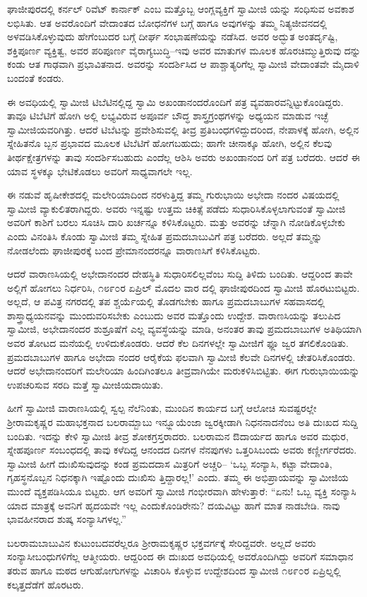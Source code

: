 ಘಾಜೀಪುರದಲ್ಲಿ ಕರ್ನಲ್ ರಿವೆಟ್ ಕಾರ್ನಾಕ್ ಎಂಬ ಮತ್ತೊಬ್ಬ ಆಂಗ್ಲವ್ಯಕ್ತಿಗೆ ಸ್ವಾಮೀಜಿ ಯನ್ನು ಸಂಧಿಸುವ ಅವಕಾಶ ಲಭಿಸಿತು. ಆತ ಅವರೊಂದಿಗೆ ವೇದಾಂತದ ಬೋಧನೆಗಳ ಬಗ್ಗೆ ಹಾಗೂ ಅವುಗಳನ್ನು ತಮ್ಮ ನಿತ್ಯಜೀವನದಲ್ಲಿ ಅಳವಡಿಸಿಕೊಳ್ಳುವುದು ಹೇಗೆಂಬುದರ ಬಗ್ಗೆ ದೀರ್ಘ ಸಂಭಾಷಣೆಯನ್ನು ನಡೆಸಿದ. ಅವರ ಅದ್ಭುತ ಅಂತರ್ದೃಷ್ಟಿ, ಶಕ್ತಿಪೂರ್ಣ ವ್ಯಕ್ತಿತ್ವ, ಅವರ ಪರಿಪೂರ್ಣ ವೈರಾಗ್ಯಬುದ್ಧಿ–ಇವು ಅವರ ಮಾತುಗಳ ಮೂಲಕ ಹೊರಚಿಮ್ಮುತ್ತಿರುವು ದನ್ನು ಕಂಡು ಆತ ಗಾಢವಾಗಿ ಪ್ರಭಾವಿತನಾದ. ಅವರನ್ನು ಸಂದರ್ಶಿಸಿದ ಆ ಪಾಶ್ಚಾತ್ಯರಿಗೆಲ್ಲ ಸ್ವಾಮೀಜಿ ವೇದಾಂತವೇ ಮೈದಾಳಿ ಬಂದಂತೆ ಕಂಡರು.

ಈ ಅವಧಿಯಲ್ಲಿ ಸ್ವಾಮೀಜಿ ಟಿಬೆಟಿನಲ್ಲಿದ್ದ ಸ್ವಾಮಿ ಅಖಂಡಾನಂದರೊಂದಿಗೆ ಪತ್ರ ವ್ಯವಹಾರವನ್ನಿಟ್ಟುಕೊಂಡಿದ್ದರು. ತಾವೂ ಟಿಬೆಟಿಗೆ ಹೋಗಿ ಅಲ್ಲಿ ಲಭ್ಯವಿರುವ ಅಪೂರ್ವ ಬೌದ್ಧ ಶಾಸ್ತ್ರಗ್ರಂಥಗಳನ್ನು ಅಧ್ಯಯನ ಮಾಡುವ ಇಚ್ಛೆ ಸ್ವಾಮೀಜಿಯವರಿಗಿತ್ತು. ಆದರೆ ಟಿಬೆಟನ್ನು ಪ್ರವೇಶಿಸುವಲ್ಲಿ ತೀವ್ರ ಪ್ರತಿಬಂಧಗಳಿದ್ದುದರಿಂದ, ನೇಪಾಳಕ್ಕೆ ಹೋಗಿ, ಅಲ್ಲಿನ ಸ್ನೇಹಿತನೊ ಬ್ಬನ ಪ್ರಭಾವದ ಮೂಲಕ ಟಿಬೆಟಿಗೆ ಹೋಗಬಹುದು; ಹಾಗೇ ಚೀನಾಕ್ಕೂ ಹೋಗಿ, ಅಲ್ಲಿನ ಕೆಲವು ತೀರ್ಥಕ್ಷೇತ್ರಗಳನ್ನು ತಾವು ಸಂದರ್ಶಿಸಬಹುದು ಎಂದೆಲ್ಲ ಆಶಿಸಿ ಅವರು ಅಖಂಡಾನಂದ ರಿಗೆ ಪತ್ರ ಬರೆದರು. ಆದರೆ ಈ ಯಾವ ಸ್ಥಳಕ್ಕೂ ಭೇಟಿಕೊಡಲು ಅವರಿಗೆ ಸಾಧ್ಯವಾಗಲೇ ಇಲ್ಲ.

ಈ ನಡುವೆ ಹೃಷೀಕೇಶದಲ್ಲಿ ಮಲೇರಿಯಾದಿಂದ ನರಳುತ್ತಿದ್ದ ತಮ್ಮ ಗುರುಭಾಯಿ ಅಭೇದಾ ನಂದರ ವಿಷಯದಲ್ಲಿ ಸ್ವಾಮೀಜಿ ವ್ಯಾಕುಲಿತರಾಗಿದ್ದರು. ಅವರು ಇನ್ನಷ್ಟು ಉತ್ತಮ ಚಿಕಿತ್ಸೆ ಪಡೆದು ಸುಧಾರಿಸಿಕೊಳ್ಳಲಾಗುವಂತೆ ಸ್ವಾಮೀಜಿ ಅವರಿಗೆ ಕಾಶಿಗೆ ಬರಲು ಸೂಚಿಸಿ ದಾರಿ ಖರ್ಚನ್ನೂ ಕಳಿಸಿಕೊಟ್ಟರು. ಮತ್ತು ಅವರನ್ನು ಚೆನ್ನಾಗಿ ನೋಡಿಕೊಳ್ಳಬೇಕು ಎಂದು ವಿನಂತಿಸಿ ಕೊಂಡು ಸ್ವಾಮೀಜಿ ತಮ್ಮ ಸ್ನೇಹಿತ ಪ್ರಮದಬಾಬುವಿಗೆ ಪತ್ರ ಬರೆದರು. ಅಲ್ಲದೆ ತಮ್ಮನ್ನು ನೋಡಲೆಂದು ಘಾಜೀಪುರಕ್ಕೆ ಬಂದ ಪ್ರೇಮಾನಂದರನ್ನೂ ವಾರಾಣಸಿಗೆ ಕಳಿಸಿಕೊಟ್ಟರು.

ಆದರೆ ವಾರಾಣಸಿಯಲ್ಲಿ ಅಭೇದಾನಂದರ ದೇಹಸ್ಥಿತಿ ಸುಧಾರಿಸಲಿಲ್ಲವೆಂಬ ಸುದ್ದಿ ತಿಳಿದು ಬಂದಿತು. ಆದ್ದರಿಂದ ತಾವೇ ಅಲ್ಲಿಗೆ ಹೋಗಲು ನಿರ್ಧರಿಸಿ, ೧೮೯೦ರ ಏಪ್ರಿಲ್ ಮೊದಲ ವಾರ ದಲ್ಲಿ ಘಾಜೀಪುರದಿಂದ ಸ್ವಾಮೀಜಿ ಹೊರಟುಬಿಟ್ಟರು. ಅಲ್ಲದೆ, ಆ ಪವಿತ್ರ ನಗರದಲ್ಲಿ ತಪ ಶ್ಚರ್ಯೆಯಲ್ಲಿ ತೊಡಗಬೇಕು ಹಾಗೂ ಪ್ರಮದಬಾಬುಗಳ ಸಹವಾಸದಲ್ಲಿ ಶಾಸ್ತ್ರಾಧ್ಯಯನವನ್ನು ಮುಂದುವರಿಸಬೇಕು ಎಂಬುದು ಅವರ ಮತ್ತೊಂದು ಉದ್ದೇಶ. ವಾರಾಣಸಿಯನ್ನು ತಲುಪಿದ ಸ್ವಾಮೀಜಿ, ಅಭೇದಾನಂದರ ಶುಶ್ರೂಷೆಗೆ ಎಲ್ಲ ವ್ಯವಸ್ಥೆಯನ್ನು ಮಾಡಿ, ಅನಂತರ ತಾವು ಪ್ರಮದಬಾಬುಗಳ ಅತಿಥಿಯಾಗಿ ಅವರ ತೋಟದ ಮನೆಯಲ್ಲಿ ಉಳಿದುಕೊಂಡರು. ಆದರೆ ಕೆಲ ದಿನಗಳಲ್ಲೇ ಸ್ವಾಮೀಜಿಗೆ ಫ್ಲೂ ಜ್ವರ ತಗಲಿಕೊಂಡಿತು. ಪ್ರಮದಬಾಬುಗಳ ಹಾಗೂ ಅಭೇದಾ ನಂದರ ಆರೈಕೆಯ ಫಲವಾಗಿ ಸ್ವಾಮೀಜಿ ಕೆಲವೇ ದಿನಗಳಲ್ಲಿ ಚೇತರಿಸಿಕೊಂಡರು. ಆದರೆ ಅಭೇದಾನಂದರಿಗೆ ಮಲೇರಿಯಾ ಹಿಂದಿಗಿಂತಲೂ ತೀವ್ರವಾಗಿಯೇ ಮರುಕಳಿಸಿಬಿಟ್ಟಿತು. ಈಗ ಗುರುಭಾಯಿಯನ್ನು ಉಪಚರಿಸುವ ಸರದಿ ಮತ್ತೆ ಸ್ವಾಮೀಜಿಯದಾಯಿತು.

ಹೀಗೆ ಸ್ವಾಮೀಜಿ ವಾರಾಣಸಿಯಲ್ಲಿ ಸ್ವಲ್ಪ ನೆಲೆನಿಂತು, ಮುಂದಿನ ಕಾರ್ಯದ ಬಗ್ಗೆ ಆಲೋಚಿ ಸುವಷ್ಟರಲ್ಲೇ ಶ್ರೀರಾಮಕೃಷ್ಣರ ಮಹಾಭಕ್ತನಾದ ಬಲರಾಮ್ಬಾಬು ಇನ್ಫ್ಲೂಯೆಂಜಾ ಜ್ವರಕ್ಕೀಡಾಗಿ ನಿಧನನಾದನೆಂಬ ಅತಿ ದುಃಖದ ಸುದ್ದಿ ಬಂದಿತು. ಇದನ್ನು ಕೇಳಿ ಸ್ವಾಮೀಜಿ ತೀವ್ರ ಶೋಕಗ್ರಸ್ತರಾದರು. ಬಲರಾಮನ ಔದಾರ್ಯದ ಹಾಗೂ ಅವರ ಮಧುರ, ಸ್ನೇಹಪೂರ್ಣ ಸಂಬಂಧದಲ್ಲಿ ತಾವು ಕಳೆದಿದ್ದ ಆನಂದದ ದಿನಗಳ ನೆನಪುಗಳು ಒತ್ತರಿಸಿಬಂದು ಅವರು ಕಣ್ಣೀರ್ಗರೆದರು. ಸ್ವಾಮೀಜಿ ಹೀಗೆ ದುಃಖಿಸುವುದನ್ನು ಕಂಡ ಪ್ರಮದದಾಸ ಮಿತ್ರರಿಗೆ ಅಚ್ಚರಿ– ‘ಒಬ್ಬ ಸಂನ್ಯಾಸಿ, ಕಟ್ಟಾ ವೇದಾಂತಿ, ಗೃಹಸ್ಥನೊಬ್ಬನ ನಿಧನಕ್ಕಾಗಿ ಇಷ್ಟೊಂದು ದುಃಖಿಸು ತ್ತಿದ್ದಾರಲ್ಲ!’ ಎಂದು. ತಮ್ಮ ಈ ಅಭಿಪ್ರಾಯವನ್ನು ಸ್ವಾಮೀಜಿಯ ಮುಂದೆ ವ್ಯಕ್ತಪಡಿಸಿಯೂ ಬಿಟ್ಟರು. ಆಗ ಅವರಿಗೆ ಸ್ವಾಮೀಜಿ ಗಂಭೀರವಾಗಿ ಹೇಳುತ್ತಾರೆ: “ಏನು! ಒಬ್ಬ ವ್ಯಕ್ತಿ ಸಂನ್ಯಾಸಿ ಯಾದ ಮಾತ್ರಕ್ಕೆ ಅವನಿಗೆ ಹೃದಯವೇ ಇಲ್ಲ ಎಂದುಕೊಂಡಿರೇನು? ದಯವಿಟ್ಟು ಹಾಗೆ ಮಾತ ನಾಡಬೇಡಿ. ನಾವು ಭಾವಹೀನರಾದ ಶುಷ್ಕ ಸಂನ್ಯಾಸಿಗಳಲ್ಲ.”

ಬಲರಾಮಬಾಬುವಿನ ಕುಟುಂಬದವರೆಲ್ಲರೂ ಶ್ರೀರಾಮಕೃಷ್ಣರ ಭಕ್ತವರ್ಗಕ್ಕೆ ಸೇರಿದ್ದವರೇ. ಅಲ್ಲದೆ ಅವರು ಸಂನ್ಯಾಸೀಬಂಧುಗಳಿಗೆಲ್ಲ ಆತ್ಮೀಯರು. ಆದ್ದರಿಂದ ಈ ದುಃಖದ ಅವಧಿಯಲ್ಲಿ ಅವರೊಂದಿಗಿದ್ದು ಅವರಿಗೆ ಸಮಾಧಾನ ತರುವ ಹಾಗೂ ಮಠದ ಆಗುಹೋಗುಗಳನ್ನು ವಿಚಾರಿಸಿ ಕೊಳ್ಳುವ ಉದ್ದೇಶದಿಂದ ಸ್ವಾಮೀಜಿ ೧೮೯೦ರ ಏಪ್ರಿಲ್ನಲ್ಲಿ ಕಲ್ಕತ್ತದೆಡೆಗೆ ಹೊರಟರು.

